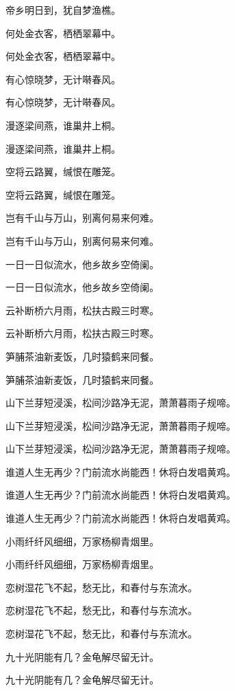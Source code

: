 \documentclass[12pt, a4paper, addpoints]{exam}
\begin{document}
\begin{questions}
\question[3] 帝乡明日到，犹自梦渔樵。

\question[3] 何处金衣客，栖栖翠幕中。

\question[3] 何处金衣客，栖栖翠幕中。

\question[3] 有心惊晓梦，无计啭春风。

\question[3] 有心惊晓梦，无计啭春风。

\question[3] 漫逐梁间燕，谁巢井上桐。

\question[3] 漫逐梁间燕，谁巢井上桐。

\question[3] 空将云路翼，缄恨在雕笼。

\question[3] 空将云路翼，缄恨在雕笼。

\question[3] 岂有千山与万山，别离何易来何难。

\question[3] 岂有千山与万山，别离何易来何难。

\question[3] 一日一日似流水，他乡故乡空倚阑。

\question[3] 一日一日似流水，他乡故乡空倚阑。

\question[3] 云补断桥六月雨，松扶古殿三时寒。

\question[3] 云补断桥六月雨，松扶古殿三时寒。

\question[3] 笋脯茶油新麦饭，几时猿鹤来同餐。

\question[3] 笋脯茶油新麦饭，几时猿鹤来同餐。

\question[3] 山下兰芽短浸溪，松间沙路净无泥，萧萧暮雨子规啼。

\question[3] 山下兰芽短浸溪，松间沙路净无泥，萧萧暮雨子规啼。

\question[3] 山下兰芽短浸溪，松间沙路净无泥，萧萧暮雨子规啼。

\question[3] 谁道人生无再少？门前流水尚能西！休将白发唱黄鸡。

\question[3] 谁道人生无再少？门前流水尚能西！休将白发唱黄鸡。

\question[3] 谁道人生无再少？门前流水尚能西！休将白发唱黄鸡。

\question[3] 小雨纤纤风细细，万家杨柳青烟里。

\question[3] 小雨纤纤风细细，万家杨柳青烟里。

\question[3] 恋树湿花飞不起，愁无比，和春付与东流水。

\question[3] 恋树湿花飞不起，愁无比，和春付与东流水。

\question[3] 恋树湿花飞不起，愁无比，和春付与东流水。

\question[3] 九十光阴能有几？金龟解尽留无计。

\question[3] 九十光阴能有几？金龟解尽留无计。


\end{questions}
\end{document}
